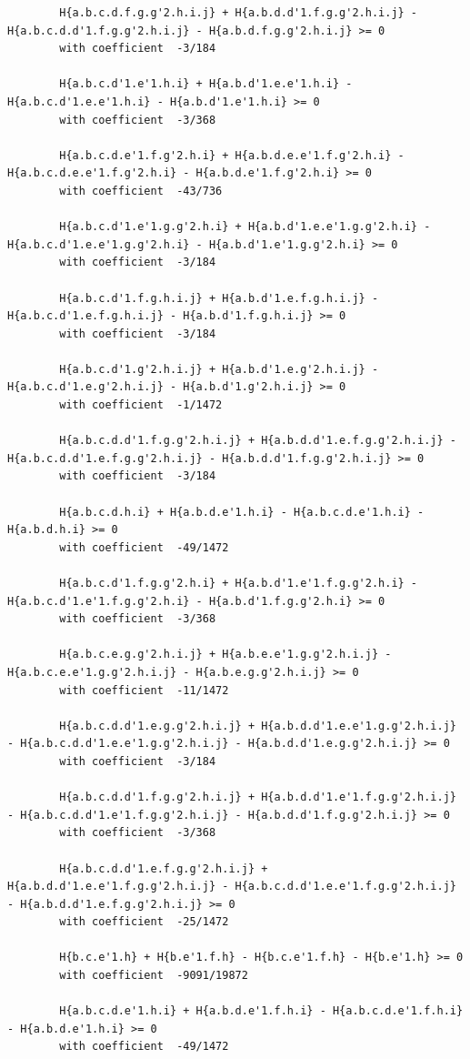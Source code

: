 \documentclass[11pt, a4paper]{kybernetika}
\begin{document}
\begin{verbatim}
		H{a.b.c.d.f.g.g'2.h.i.j} + H{a.b.d.d'1.f.g.g'2.h.i.j} - H{a.b.c.d.d'1.f.g.g'2.h.i.j} - H{a.b.d.f.g.g'2.h.i.j} >= 0
		with coefficient  -3/184
		
		H{a.b.c.d'1.e'1.h.i} + H{a.b.d'1.e.e'1.h.i} - H{a.b.c.d'1.e.e'1.h.i} - H{a.b.d'1.e'1.h.i} >= 0
		with coefficient  -3/368
		
		H{a.b.c.d.e'1.f.g'2.h.i} + H{a.b.d.e.e'1.f.g'2.h.i} - H{a.b.c.d.e.e'1.f.g'2.h.i} - H{a.b.d.e'1.f.g'2.h.i} >= 0
		with coefficient  -43/736
		
		H{a.b.c.d'1.e'1.g.g'2.h.i} + H{a.b.d'1.e.e'1.g.g'2.h.i} - H{a.b.c.d'1.e.e'1.g.g'2.h.i} - H{a.b.d'1.e'1.g.g'2.h.i} >= 0
		with coefficient  -3/184
		
		H{a.b.c.d'1.f.g.h.i.j} + H{a.b.d'1.e.f.g.h.i.j} - H{a.b.c.d'1.e.f.g.h.i.j} - H{a.b.d'1.f.g.h.i.j} >= 0
		with coefficient  -3/184
		
		H{a.b.c.d'1.g'2.h.i.j} + H{a.b.d'1.e.g'2.h.i.j} - H{a.b.c.d'1.e.g'2.h.i.j} - H{a.b.d'1.g'2.h.i.j} >= 0
		with coefficient  -1/1472
		
		H{a.b.c.d.d'1.f.g.g'2.h.i.j} + H{a.b.d.d'1.e.f.g.g'2.h.i.j} - H{a.b.c.d.d'1.e.f.g.g'2.h.i.j} - H{a.b.d.d'1.f.g.g'2.h.i.j} >= 0
		with coefficient  -3/184
		
		H{a.b.c.d.h.i} + H{a.b.d.e'1.h.i} - H{a.b.c.d.e'1.h.i} - H{a.b.d.h.i} >= 0
		with coefficient  -49/1472
		
		H{a.b.c.d'1.f.g.g'2.h.i} + H{a.b.d'1.e'1.f.g.g'2.h.i} - H{a.b.c.d'1.e'1.f.g.g'2.h.i} - H{a.b.d'1.f.g.g'2.h.i} >= 0
		with coefficient  -3/368
		
		H{a.b.c.e.g.g'2.h.i.j} + H{a.b.e.e'1.g.g'2.h.i.j} - H{a.b.c.e.e'1.g.g'2.h.i.j} - H{a.b.e.g.g'2.h.i.j} >= 0
		with coefficient  -11/1472
		
		H{a.b.c.d.d'1.e.g.g'2.h.i.j} + H{a.b.d.d'1.e.e'1.g.g'2.h.i.j} - H{a.b.c.d.d'1.e.e'1.g.g'2.h.i.j} - H{a.b.d.d'1.e.g.g'2.h.i.j} >= 0
		with coefficient  -3/184
		
		H{a.b.c.d.d'1.f.g.g'2.h.i.j} + H{a.b.d.d'1.e'1.f.g.g'2.h.i.j} - H{a.b.c.d.d'1.e'1.f.g.g'2.h.i.j} - H{a.b.d.d'1.f.g.g'2.h.i.j} >= 0
		with coefficient  -3/368
		
		H{a.b.c.d.d'1.e.f.g.g'2.h.i.j} + H{a.b.d.d'1.e.e'1.f.g.g'2.h.i.j} - H{a.b.c.d.d'1.e.e'1.f.g.g'2.h.i.j} - H{a.b.d.d'1.e.f.g.g'2.h.i.j} >= 0
		with coefficient  -25/1472
		
		H{b.c.e'1.h} + H{b.e'1.f.h} - H{b.c.e'1.f.h} - H{b.e'1.h} >= 0
		with coefficient  -9091/19872
		
		H{a.b.c.d.e'1.h.i} + H{a.b.d.e'1.f.h.i} - H{a.b.c.d.e'1.f.h.i} - H{a.b.d.e'1.h.i} >= 0
		with coefficient  -49/1472
		

\end{verbatim}
\end{document}
